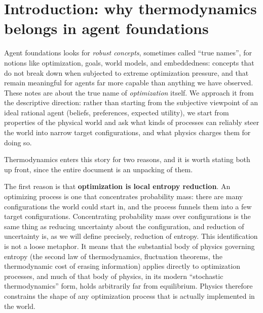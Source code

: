 \documentclass[10pt]{article}
\theoremstyle{definition}
\theoremstyle{remark}
\begin{document}
\tableofcontents

\section{Introduction: why thermodynamics belongs in agent foundations}
\label{sec:intro}

Agent foundations looks for \emph{robust concepts}, sometimes called ``true names'', for notions like optimization, goals, world models, and embeddedness: concepts that do not break down when subjected to extreme optimization pressure, and that remain meaningful for agents far more capable than anything we have observed. These notes are about the true name of \emph{optimization} itself. We approach it from the descriptive direction: rather than starting from the subjective viewpoint of an ideal rational agent (beliefs, preferences, expected utility), we start from properties of the physical world and ask what kinds of processes can reliably steer the world into narrow target configurations, and what physics charges them for doing so.

Thermodynamics enters this story for two reasons, and it is worth stating both up front, since the entire document is an unpacking of them.

The first reason is that \textbf{optimization is local entropy reduction}. An optimizing process is one that concentrates probability mass: there are many configurations the world could start in, and the process funnels them into a few target configurations. Concentrating probability mass over configurations is the same thing as reducing uncertainty about the configuration, and reduction of uncertainty is, as we will define precisely, reduction of entropy. This identification is not a loose metaphor. It means that the substantial body of physics governing entropy (the second law of thermodynamics, fluctuation theorems, the thermodynamic cost of erasing information) applies directly to optimization processes, and much of that body of physics, in its modern ``stochastic thermodynamics'' form, holds arbitrarily far from equilibrium. Physics therefore constrains the shape of any optimization process that is actually implemented in the world.
\end{document}

